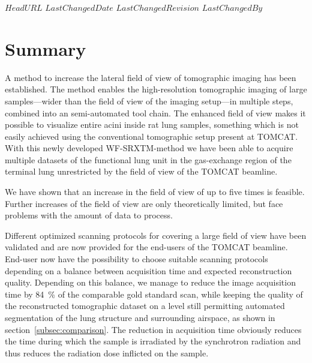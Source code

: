 \svnidlong
{$HeadURL$}
{$LastChangedDate$}
{$LastChangedRevision$}
{$LastChangedBy$}
%
\section{Summary}\label{summary}

A method to increase the lateral field of view of tomographic imaging has been established. The method enables the high-resolution tomographic imaging of large samples---wider than the field of view of the imaging setup---in multiple steps, combined into an semi-automated tool chain. The enhanced field of view makes it possible to visualize entire acini inside rat lung samples, something which is not easily achieved using the conventional tomographic setup present at TOMCAT. With this newly developed WF-SRXTM-method we have been able to acquire multiple datasets of the functional lung unit in the gas-exchange region of the terminal lung unrestricted by the field of view of the TOMCAT beamline.

We have shown that an increase in the field of view of up to five times is feasible. Further increases of the field of view are only theoretically limited, but face problems with the amount of data to process. 

Different optimized scanning protocols for covering a large field of view have been validated and are now provided for the end-users of the TOMCAT beamline. End-user now have the possibility to choose suitable scanning protocols depending on a balance between acquisition time and expected reconstruction quality. Depending on this balance, we manage to reduce the image acquisition time by \SI{84}{\percent} of the comparable gold standard scan, while keeping the quality of the reconstructed tomographic dataset on a level still permitting automated segmentation of the lung structure and surrounding airspace, as shown in section~\ref{subsec:comparison}. The reduction in acquisition time obviously reduces the time during which the sample is irradiated by the synchrotron radiation and thus reduces the radiation dose inflicted on the sample.
